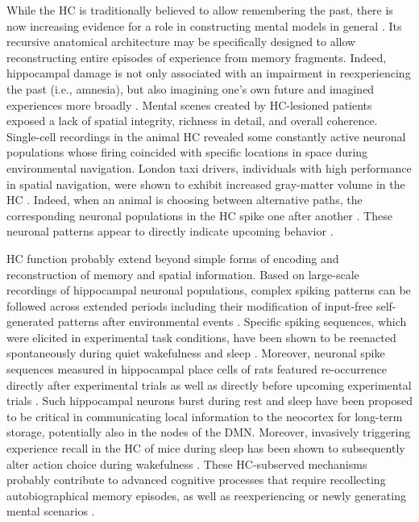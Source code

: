 \documentclass[10pt,letterpaper]{article}
\begin{document}
While the HC
is traditionally believed to allow remembering the past,
there is now increasing evidence for a role
in constructing mental models in general
\citep{maguire2016, schacter2007remembering, gelbard2008internally, Javadi2017}.
Its recursive anatomical architecture
may be specifically designed to allow reconstructing
entire episodes of experience from memory fragments.
Indeed,
hippocampal damage is
not only associated with an impairment in reexperiencing the past (i.e., amnesia),
but also imagining one's own future and
imagined experiences more broadly \citep{hassabis2007patients}.
Mental scenes created by HC-lesioned patients exposed a lack of
spatial integrity, richness in detail, and overall coherence.
%
Single-cell recordings in the animal HC revealed
some constantly active neuronal populations whose firing coincided with
specific locations in space during environmental navigation.
London taxi drivers, individuals with high performance in spatial navigation,
were shown to exhibit increased gray-matter volume in the
HC \citep{maguire2000navigation}.
Indeed, when an animal is choosing between alternative
paths, the corresponding neuronal populations in the HC
spike one after another  \citep{johnson2007neural}.
These neuronal patterns appear to directly indicate upcoming behavior
\citep{pfeiffer2013hippocampal}.


HC function probably extend beyond simple forms of
encoding and reconstruction of memory and spatial information.
Based on large-scale recordings of hippocampal neuronal populations,
complex spiking patterns can be followed across extended periods including
their modification of input-free self-generated patterns
after environmental events \citep{buzsaki2004large}.
Specific spiking sequences, which were elicited in experimental task conditions,
have been shown to be reenacted spontaneously during
quiet wakefulness and sleep \citep{hartley2014space, o2010play}.
Moreover, neuronal spike sequences measured in hippocampal place cells of rats
featured re-occurrence directly after experimental trials
as well as directly before upcoming experimental trials \citep{diba2007forward}.
Such hippocampal neurons burst during rest and sleep
have been proposed to be critical in communicating local information
to the neocortex for long-term storage, potentially also in the nodes of the DMN.
Moreover, invasively triggering experience recall
in the HC of mice during sleep
has been shown to subsequently alter action choice during wakefulness
\citep{lavilleon2015}.
These HC-subserved mechanisms
probably contribute to advanced cognitive processes that require
recollecting autobiographical memory episodes, as well as
reexperiencing or newly generating mental scenarios
\citep{hassabis2007patients}.
\end{document}
